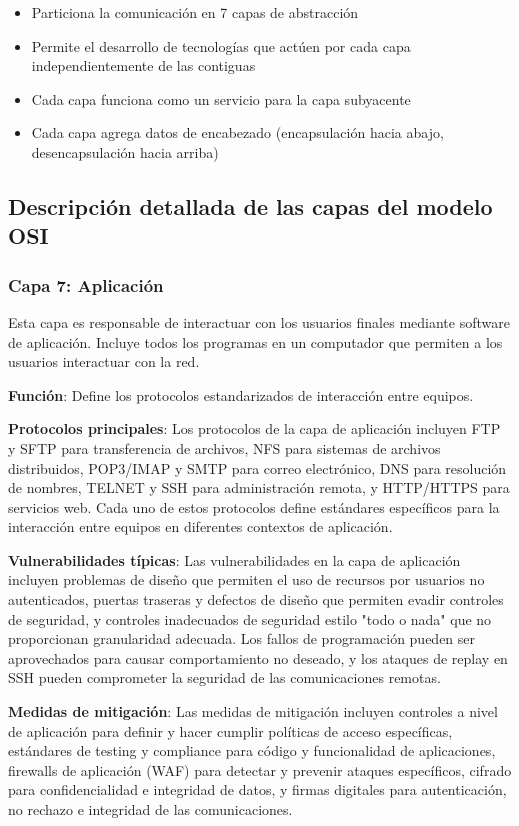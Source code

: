 \begin{itemize}
\begin{itemize}
    \item Particiona la comunicación en 7 capas de abstracción
    \item Permite el desarrollo de tecnologías que actúen por cada capa independientemente de las contiguas
    \item Cada capa funciona como un servicio para la capa subyacente
    \item Cada capa agrega datos de encabezado (encapsulación hacia abajo, desencapsulación hacia arriba)
\end{itemize}

\subsection{Descripción detallada de las capas del modelo OSI}

\subsubsection{Capa 7: Aplicación}

Esta capa es responsable de interactuar con los usuarios finales mediante software de aplicación. Incluye todos los programas en un computador que permiten a los usuarios interactuar con la red.

\textbf{Función}: Define los protocolos estandarizados de interacción entre equipos.

\textbf{Protocolos principales}:
Los protocolos de la capa de aplicación incluyen FTP y SFTP para transferencia de archivos, NFS para sistemas de archivos distribuidos, POP3/IMAP y SMTP para correo electrónico, DNS para resolución de nombres, TELNET y SSH para administración remota, y HTTP/HTTPS para servicios web. Cada uno de estos protocolos define estándares específicos para la interacción entre equipos en diferentes contextos de aplicación.

\textbf{Vulnerabilidades típicas}:
Las vulnerabilidades en la capa de aplicación incluyen problemas de diseño que permiten el uso de recursos por usuarios no autenticados, puertas traseras y defectos de diseño que permiten evadir controles de seguridad, y controles inadecuados de seguridad estilo "todo o nada" que no proporcionan granularidad adecuada. Los fallos de programación pueden ser aprovechados para causar comportamiento no deseado, y los ataques de replay en SSH pueden comprometer la seguridad de las comunicaciones remotas.

\textbf{Medidas de mitigación}:
Las medidas de mitigación incluyen controles a nivel de aplicación para definir y hacer cumplir políticas de acceso específicas, estándares de testing y compliance para código y funcionalidad de aplicaciones, firewalls de aplicación (WAF) para detectar y prevenir ataques específicos, cifrado para confidencialidad e integridad de datos, y firmas digitales para autenticación, no rechazo e integridad de las comunicaciones.


\end{itemize}
